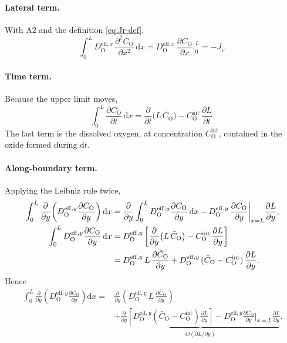 \documentclass[12pt]{article}
\newcommand{\eff}{\mathrm{eff}}
\newcommand{\intf}{\mathrm{int}}
\newcommand{\Ox}{\mathrm{O}}
\newcommand{\Dx}{D_{\Ox}^{\eff,x}}
\newcommand{\Dy}{D_{\Ox}^{\eff,y}}
\newcommand{\Cb}{\bar{C}_{\Ox}}
\newcommand{\Ci}{C_{\Ox}^{\intf}}
\newcommand{\Jr}{J_{\mathrm{r}}}
\newcommand{\dd}{\mathrm{d}}
\begin{document}
\paragraph{Lateral term.} With A2 and the definition \eqref{eq:Jr-def},
\begin{equation}
\int_{0}^{L}\Dx\,\frac{\partial^2 C_{\Ox}}{\partial x^2}\,\dd x
 =\Dx\,\frac{\partial C_{\Ox}}{\partial x}\bigg|_{0}^{L}
 =-\Jr .
\label{eq:int-lateral}
\end{equation}

\paragraph{Time term.} Because the upper limit moves,
\begin{equation}
\int_{0}^{L}\frac{\partial C_{\Ox}}{\partial t}\,\dd x
 =\frac{\partial}{\partial t}\bigl(L\,\Cb\bigr)-\Ci\,\frac{\partial L}{\partial t}.
\label{eq:int-time}
\end{equation}
The last term is the dissolved oxygen, at concentration \(\Ci\), contained in
the oxide formed during \(\dd t\).

\paragraph{Along-boundary term.} Applying the Leibniz rule twice,
\begin{align}
\int_{0}^{L}\frac{\partial}{\partial y}\!\left(\Dy\frac{\partial C_{\Ox}}{\partial y}\right)\dd x
 &=\frac{\partial}{\partial y}\int_{0}^{L}\Dy\frac{\partial C_{\Ox}}{\partial y}\,\dd x
   -\Dy\,\frac{\partial C_{\Ox}}{\partial y}\bigg|_{x=L}\frac{\partial L}{\partial y},
\\
\int_{0}^{L}\Dy\frac{\partial C_{\Ox}}{\partial y}\,\dd x
 &=\Dy\left[\frac{\partial}{\partial y}\bigl(L\,\Cb\bigr)-\Ci\,\frac{\partial L}{\partial y}\right]
 \notag\\
 &=\Dy\,L\,\frac{\partial\Cb}{\partial y}
   +\Dy\,(\Cb-\Ci)\,\frac{\partial L}{\partial y}.
\end{align}
Hence
\begin{equation}
\begin{aligned}
\int_{0}^{L}\frac{\partial}{\partial y}\!\left(\Dy\frac{\partial C_{\Ox}}{\partial y}\right)\dd x
 ={}&\frac{\partial}{\partial y}\!\left(\Dy\,L\,\frac{\partial\Cb}{\partial y}\right)\\
  &+\underbrace{\frac{\partial}{\partial y}\!\left[\Dy(\Cb-\Ci)\frac{\partial L}{\partial y}\right]
   -\Dy\frac{\partial C_{\Ox}}{\partial y}\bigg|_{x=L}\frac{\partial L}{\partial y}}_{O(\partial L/\partial y)} .
\end{aligned}
\label{eq:int-y}
\end{equation}
\end{document}
